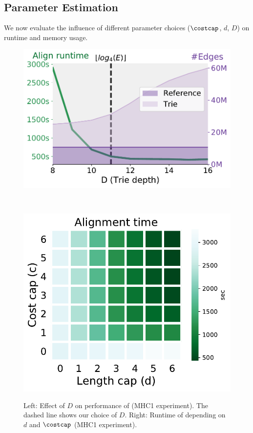 \subsection{Parameter Estimation} \label{subsec:parameter_estimation}
We now evaluate the influence of different parameter choices ($\costcap$, $d$,
$D$) on runtime and memory usage.

\begin{figure}[b]
	\centering
	\begin{minipage}{0.48\linewidth}
		\centering
		\includegraphics[width=\linewidth]{figs/trie/MHC1-trie-vs-D.pdf}
		\caption{Left: Effect of $D$ on performance of \astarix (MHC1 experiment). The dashed line shows our choice of $D$. Right: Runtime of \astarix depending on $d$ and $\costcap$ (MHC1 experiment).}
		\label{fig:trie_vs_D}
	\end{minipage}~\hspace{0.7em}
	\begin{minipage}{0.49\linewidth}
		\centering
		\includegraphics[width=0.8\linewidth]{figs/heuristic/MHC1-heatmap-c_vs_d-align_sec.pdf}
		\label{fig:heuristic-parameters}
	\end{minipage}
\end{figure}

